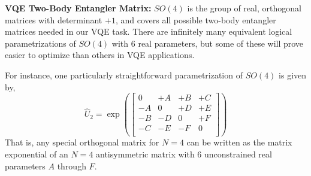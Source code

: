 \textbf{VQE Two-Body Entangler Matrix:} $SO(4)$ is the group of real, orthogonal
matrices with determinant $+1$, and covers all possible two-body entangler
matrices needed in our VQE task. There are infinitely many equivalent logical
parametrizations of $SO(4)$ with 6 real parameters, but some of these will prove
easier to optimize than others in VQE applications. 

For instance, one particularly straightforward parametrization of $SO(4)$ is
given by,
\begin{equation}
\label{eq:so4mark1}
\hat U_2
=
\exp
\left (
\left [
\begin{array}{cccc}
 0 & +A & +B & +C \\
-A &  0 & +D & +E \\
-B & -D &  0 & +F \\
-C & -E & -F &  0 \\
\end{array}
\right ]
\right )
\end{equation}
That is, any special orthogonal matrix for $N=4$ can be written as the matrix
exponential of an $N=4$ antisymmetric matrix with 6 unconstrained real
parameters $A$ through $F$.

